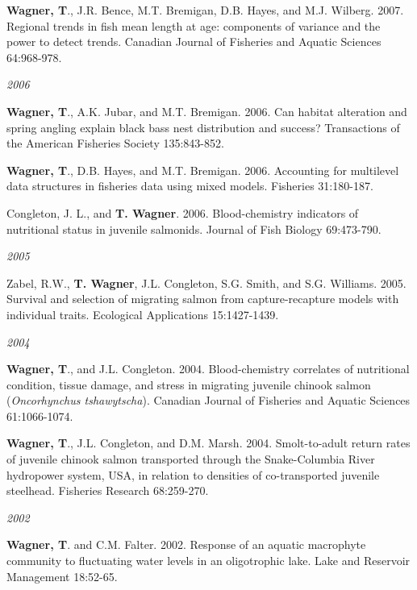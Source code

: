 \documentclass[10pt]{article}
\begin{document}
\begin{flushleft}
\begin{etaremune}[start=9]
\item {\bf Wagner, T}., J.R. Bence, M.T. Bremigan, D.B. Hayes, and M.J. Wilberg. 2007. Regional trends in fish mean length at age: components of variance and the power to detect trends. Canadian Journal of Fisheries and Aquatic Sciences 64:968-978.

\end{etaremune}
\emph{2006}
\begin{etaremune}[start=7]
\item {\bf Wagner, T}., A.K. Jubar, and M.T. Bremigan. 2006. Can habitat alteration and spring angling explain black bass nest distribution and success? Transactions of the American Fisheries Society 135:843-852.

\item {\bf Wagner, T}., D.B. Hayes, and M.T. Bremigan. 2006. Accounting for multilevel data structures in fisheries data using mixed models. Fisheries 31:180-187.

\item Congleton, J. L., and {\bf T. Wagner}. 2006. Blood-chemistry indicators of nutritional status in juvenile salmonids. Journal of Fish Biology 69:473-790.

\end{etaremune}
\emph{2005}
\begin{etaremune}[start=4]
\item Zabel, R.W., {\bf T. Wagner}, J.L. Congleton, S.G. Smith, and S.G. Williams. 2005. Survival and selection of migrating salmon from capture-recapture models with individual traits. Ecological Applications 15:1427-1439. 

\end{etaremune}
\emph{2004}
\begin{etaremune}[start=3]
\item {\bf Wagner, T}., and J.L. Congleton. 2004. Blood-chemistry correlates of nutritional condition, tissue damage, and stress in migrating juvenile chinook salmon (\emph{Oncorhynchus tshawytscha}). Canadian Journal of Fisheries and Aquatic Sciences 61:1066-1074.

\item {\bf Wagner, T}., J.L. Congleton, and D.M. Marsh. 2004. Smolt-to-adult return rates of juvenile chinook salmon transported through the Snake-Columbia River hydropower system, USA, in relation to densities of co-transported juvenile steelhead. Fisheries Research 68:259-270.

\end{etaremune}
\emph{2002}
\begin{etaremune}[start=1]
\item {\bf Wagner, T}. and C.M. Falter. 2002. Response of an aquatic macrophyte community to fluctuating water levels in an oligotrophic lake. Lake and Reservoir Management 18:52-65.
\end{etaremune}


\end{flushleft}
\end{document}
